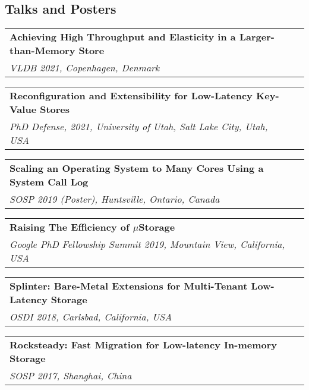 \documentclass[margin,line]{res}
\begin{document}
\begin{resume}
\section{\sc Talks and Posters}
\begin{tabular}{@{}p{5.5in}p{4in}}
{\bf Achieving High Throughput and Elasticity in a Larger-than-Memory Store}\\
{\small\em VLDB 2021, Copenhagen, Denmark}\\
\end{tabular}

\vspace{-7pt}
\begin{tabular}{@{}p{5.5in}p{4in}}
{\bf Reconfiguration and Extensibility for Low-Latency Key-Value Stores}\\
{\small\em PhD Defense, 2021, University of Utah, Salt Lake City, Utah, USA}\\
\end{tabular}

\vspace{-7pt}
\begin{tabular}{@{}p{5.5in}p{4in}}
{\bf Scaling an Operating System to Many Cores Using a System Call Log}\\
{\small\em SOSP 2019 (Poster), Huntsville, Ontario, Canada}\\
\end{tabular}

\vspace{-7pt}
\begin{tabular}{@{}p{5.5in}p{4in}}
{\bf Raising The Efficiency of $\mu$Storage}\\
{\small\em Google PhD Fellowship Summit 2019, Mountain View, California,
USA}\\
\end{tabular}

\vspace{-7pt}
\begin{tabular}{@{}p{5.5in}p{4in}}
{\bf Splinter: Bare-Metal Extensions for Multi-Tenant Low-Latency Storage}\\
{\small\em OSDI 2018, Carlsbad, California, USA}\\
\end{tabular}

\vspace{-7pt}
\begin{tabular}{@{}p{5.5in}p{4in}}
{\bf Rocksteady: Fast Migration for Low-latency In-memory Storage}\\
{\small\em SOSP 2017, Shanghai, China}\\
\end{tabular}


\end{resume}
\end{document}

